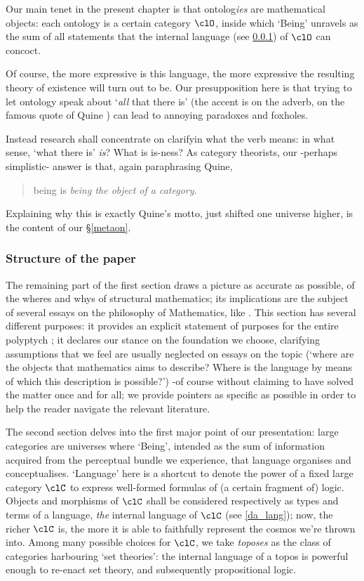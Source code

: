 Our main tenet in the present chapter is that ontolog\emph{ies} are mathematical objects: each ontology is a certain category $\clO$, inside which `Being' unravels as the sum of all statements that the internal language (see \ref{}) of $\clO$ can concoct. 

Of course, the more expressive is this language, the more expressive the resulting theory of existence will turn out to be. Our presupposition here is that trying to let ontology speak about `\emph{all} that there is' (the accent is on the adverb, on the famous quote of Quine \cite{}) can lead to annoying paradoxes and foxholes.

Instead research shall concentrate on clarifyin what the verb means: in what sense, `what there is' \emph{is}? What is is-ness? As category theorists, our -perhaps simplistic- answer is that, again paraphrasing Quine, 
\begin{quote}
being is \emph{being the object of a category}.
\end{quote}
Explaining why this is exactly Quine's motto, just shifted one universe higher, is the content of our §\ref{metaon}.
\subsubsection{Structure of the paper}
The remaining part of the first section draws a picture as accurate as possible, of the wheres and whys of structural mathematics; its implications are the subject of several essays on the philosophy of Mathematics, like \cite{kromer2007tool,Marquis1997,marquis2010category,marquis2008geometrical}. This section has several different purposes: it provides an explicit statement of purposes for the entire polyptych \cite{black,homot}; it declares our stance on the foundation we choose, clarifying assumptions that we feel are usually neglected on essays on the topic (`where are the objects that mathematics aims to describe? Where is the language by means of which this description is possible?') -of course without claiming to have solved the matter once and for all; we provide pointers as specific as possible in order to help the reader navigate the relevant literature.

The second section delves into the first major point of our presentation: large categories are universes where `Being', intended as the sum of information acquired from the perceptual bundle we experience, that language organises and conceptualises. `Language' here is a shortcut to denote the power of a fixed large category $\clC$ to express well-formed formulas of (a certain fragment of) logic. Objects and morphisms of $\clC$ shall be considered respectively as types and terms of a language, \emph{the} internal language of $\clC$ (see \autoref{da_lang}); now, the richer $\clC$ is, the more it is able to faithfully represent the cosmos we're thrown into. Among many possible choices for $\clC$, we take \emph{toposes} as the class of categories harbouring `set theories': the internal language of a topos is powerful enough to re-enact set theory, and subsequently propositional logic.

